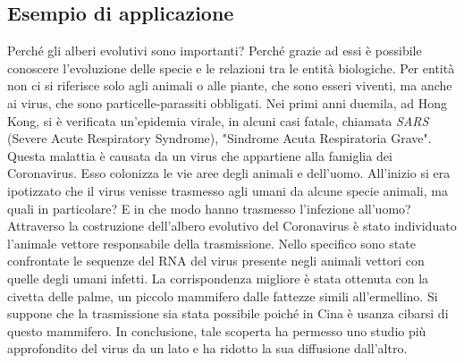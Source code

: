 \subsection*{Esempio di applicazione}
Perché gli alberi evolutivi sono importanti? Perché grazie ad essi è possibile conoscere l'evoluzione delle specie e le relazioni tra le entità biologiche. Per entità non ci si riferisce solo agli animali o alle piante, che sono esseri viventi, ma anche ai virus, che sono particelle-parassiti obbligati.
\newline
Nei primi anni duemila, ad Hong Kong, si è verificata un'epidemia virale, in alcuni casi fatale, chiamata \textit{SARS} (Severe Acute Respiratory Syndrome), "Sindrome Acuta Respiratoria Grave".
\newline
Questa malattia è causata da un virus che appartiene alla famiglia dei Coronavirus. Esso colonizza le vie aree degli animali e dell'uomo. All'inizio si era ipotizzato che il virus venisse trasmesso agli umani da alcune specie animali, ma quali in particolare? E in che modo hanno trasmesso l'infezione all'uomo?
\newline
Attraverso la costruzione dell'albero evolutivo del Coronavirus è stato individuato l'animale vettore responsabile della trasmissione. Nello specifico sono state confrontate le sequenze del RNA del virus presente negli animali vettori con quelle degli umani infetti. La corrispondenza migliore è stata ottenuta con la civetta delle palme, un piccolo mammifero dalle fattezze simili all'ermellino. Si suppone che la trasmissione sia stata possibile poiché in Cina è usanza cibarsi di questo mammifero.
\newline
In conclusione, tale scoperta ha permesso uno studio più approfondito del virus da un lato e ha ridotto la sua diffusione dall'altro.

\newpage


